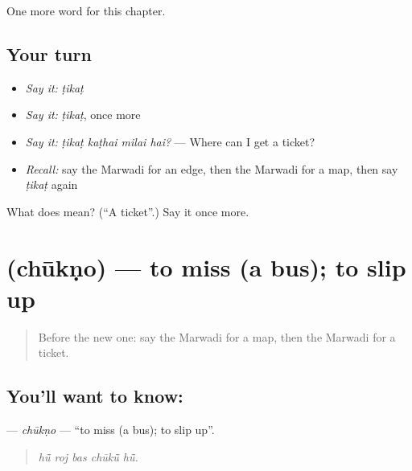 \begin{grammarlens}[title={What you've built}]
One more word for this chapter.
\end{grammarlens}

\subsection*{Your turn}
\begin{itemize}
\raggedright
  \item \emph{Say it:} \emph{ṭikaṭ}
  \item \emph{Say it:} \emph{ṭikaṭ}, once more
  \item \emph{Say it:} \emph{ṭikaṭ kaṭhai milai hai?} — Where can I get a ticket?
  \item \emph{Recall:} say the Marwadi for an edge, then the Marwadi for a map, then say \emph{ṭikaṭ} again
\end{itemize}

\begin{tcolorbox}[breakable,colback=teal!4,colframe=teal!35!black,title={Before you move on}]
What does  mean? (\textquotedblleft{}A ticket\textquotedblright{}.) Say it once more.
\end{tcolorbox}
\section[\texorpdfstring{\mw{चूकणो} (chūkṇo)}{चूकणो (chūkṇo)}]{ (chūkṇo) — to miss (a bus); to slip up}

\label{lesson:MW-C205-chukno}



\begin{quote}
Before the new one: say the Marwadi for a map, then the Marwadi for a ticket.
\end{quote}

\subsection*{You'll want to know: }
\textbf{} — \emph{chūkṇo} — \textquotedblleft{}to miss (a bus); to slip up\textquotedblright{}.

\begin{quote}
    
\end{quote}

\begin{quote}
\emph{hū̃ roj bas chūkū̃ hū̃.}
\end{quote}

